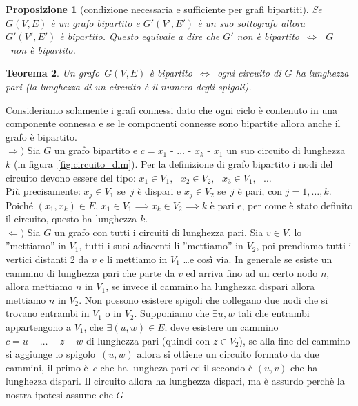 \documentclass[a4paper, oneside, openany]{book}
\theoremstyle{plain}
\newtheorem{thm}{Teorema}[section]
\newtheorem{prop}[thm]{Proposizione}
\theoremstyle{definition}
\begin{document}
\begin{prop}[condizione necessaria e sufficiente per grafi bipartiti]
Se $G(V,E)$ è un grafo bipartito e $G'(V',E')$ è un suo sottografo allora
$G'(V',E')$ è bipartito.
Questo equivale a dire che $G'$ non è bipartito~$\iff \text{ } G$~non è bipartito. 
\end{prop}

\begin{thm}
Un grafo~$G(V,E)$ è bipartito~$\iff$~ogni circuito di $G$ ha lunghezza pari
(la lunghezza di un circuito è il numero degli spigoli).
\end{thm}
\proof
Consideriamo solamente i grafi connessi dato che ogni ciclo è contenuto in una componente
connessa e se le componenti connesse sono bipartite allora anche il grafo è bipartito.\\
$\Longrightarrow)$ Sia $G$ un grafo bipartito e ${c = x_1\text{ - }\dots\text{ - }x_k\text{ - }x_1}$
un suo circuito di lunghezza $k$ (in figura~\ref{fig:circuito_dim}).
Per la definizione di grafo bipartito i nodi del circuito devono essere del tipo:
${x_1 \in V_1,}\text{ }{x_2 \in V_2,}\text{ }{x_3 \in V_1,\text{ }\dots}$\\ 
Più precisamente: ${x_j \in V_1}$ se~$j$ è dispari e ${x_j \in V_2}$ se~$j$ è pari, con
${j = 1,\dots,k}$.\\
Poiché ${(x_1, x_k) \in E} \text{, } {x_1 \in V_1 \implies x_k \in V_2 \implies k}$ è pari
e, per come è stato definito il circuito, questo ha lunghezza $k$.\\
$\Longleftarrow)$ Sia $G$ un grafo con tutti i circuiti di lunghezza pari. Sia $v \in V$,
lo ''mettiamo'' in $V_1$, tutti i suoi adiacenti li ''mettiamo'' in $V_2$, poi prendiamo
tutti i vertici distanti 2 da $v$ e li mettiamo in $V_1$ \dots e così via.
In generale se esiste un cammino di lunghezza pari che parte da $v$ ed arriva fino ad un certo
nodo $n$, allora mettiamo $n$ in $V_1$, se invece il cammino ha lunghezza dispari allora
mettiamo $n$ in $V_2$.
Non possono esistere spigoli che collegano due nodi che si trovano entrambi in $V_1$ o in $V_2$.
Supponiamo che $\exists u,w$ tali che entrambi appartengono a $V_1$, che ${\exists (u,w) \in E}$;
deve esistere un cammino ${c = u - \dots - z - w}$ di lunghezza pari (quindi con ${z \in V_2}$),
se alla fine del cammino si aggiunge lo spigolo~$(u,w)$ allora si ottiene un circuito formato da
due cammini, il primo è~$c$ che ha lungheza pari ed il secondo è $(u,v)$ che ha lunghezza dispari.
Il circuito allora ha lunghezza dispari, ma è assurdo perchè la nostra ipotesi assume che $G$ 
\end{document}
